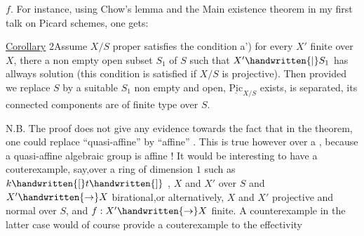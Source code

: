 $f$. For instance, using Chow's lemma and the Main existence theorem in my first talk on Picard schemes, one gets:

\uline{Corollary} 2\quad Assume $X/S$ proper satisfies the condition\unsure{;|:}   a') for every $X'$ finite over $X$, there  a non empty open subset $S_1$ of $S$ such that  $X'\handwritten{\mid}S_1$ has allways solution  (this condition is satisfied if $X/S$ is projective). Then  provided we replace $S$ by a suitable $S_1$ non empty and open, $\underline{\mathrm{Pic}}_{X/S}$ exists, is separated, its connected components are of finite type over $S$.

N.B. The proof does not give any evidence towards the fact that in the theorem, one could replace ``quasi-affine'' by ``affine'' . This is true however over a , because a quasi-affine algebraic group is affine ! It would be interesting to have a couterexample, say,over a  ring of dimension $1$ such as $k\handwritten{[}t\handwritten{]}$ , $X$ and $X'$
\noindent over $S$ and $X'\handwritten{\to}X$ birational,or alternatively,  $X$ and $X'$ projective and normal over $S$, and $f:X'\handwritten{\to}X$ finite. A counterexample in the latter case would of course provide a couterexample to the effectivity

